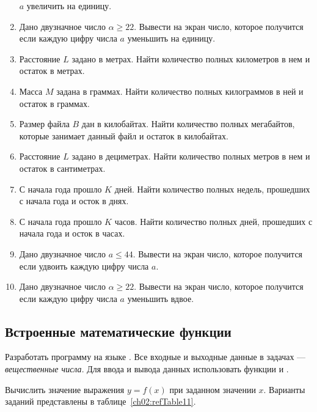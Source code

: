 \begin{enumerate}
$a$ увеличить на единицу.
\item Дано двузначное число $\alpha\ge 22$. Вывести на экран число, которое получится если каждую цифру числа
$a$ уменьшить на единицу.
\item Расстояние $L$ задано в метрах. Найти количество полных километров в нем и остаток в метрах.
\item Масса $M$ задана в граммах. Найти количество полных килограммов в ней и остаток в граммах.
\item Размер файла $B$ дан в килобайтах. Найти
количество полных мегабайтов, которые занимает данный файл и остаток в килобайтах.
\item Расстояние $L$ задано в дециметрах. Найти количество полных метров в нем и остаток в
сантиметрах.
\item С начала года прошло $K$ дней. Найти количество полных недель, прошедших с начала года и осток в
днях.
\item С начала года прошло $K$ часов. Найти количество полных дней, прошедших с начала года и осток в
часах.
\item Дано двузначное число $a\le 44$. Вывести на экран число, которое получится если удвоить каждую цифру
числа $a$.
\item Дано двузначное число $\alpha\ge 22$. Вывести на экран число, которое получится если каждую цифру числа
$a$ уменьшить вдвое.
\end{enumerate}

\subsection[Встроенные математические функции]{Встроенные математические функции}
Разработать программу на языке . Все входные и выходные данные в задачах --- \emph{вещественные числа}.
Для ввода и вывода данных использовать функции  и .

Вычислить значение выражения $y=f(x)$ при заданном значении
$x$. Варианты заданий представлены в таблице~\ref{ch02:refTable11}.

